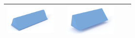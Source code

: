 \begin{table}[H]
\begin{tabulary} {0.95\textwidth}{Lc Lc L}
\parbox[c]{1em}{\includegraphics[width=1in]{Figures/Ripple13d}} &
& \parbox[c]{1em}{\includegraphics[width=1in]{Figures/Ripple23d}}  \\
\hline 
\end{tabulary}
\end{table}






